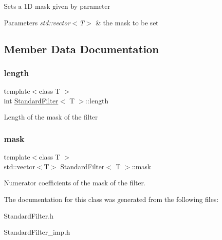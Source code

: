 Sets a 1D mask given by parameter 
\begin{DoxyParams}{Parameters}
{\em std\+::vector$<$\+T$>$} & the mask to be set \\
\hline
\end{DoxyParams}


\subsection{Member Data Documentation}
\mbox{\label{class_standard_filter_aa693971cea1c7c485a19928fd77a91c7}} 
\subsubsection{\texorpdfstring{length}{length}}
{\footnotesize\ttfamily template$<$class T $>$ \\
int \hyperlink{class_standard_filter}{Standard\+Filter}$<$ T $>$\+::length\hspace{0.3cm}{\ttfamily [protected]}}

Length of the mask of the filter \mbox{\label{class_standard_filter_afc83cf6d1aa9cf9a1ae4a8c476d8a66d}} 
\subsubsection{\texorpdfstring{mask}{mask}}
{\footnotesize\ttfamily template$<$class T $>$ \\
std\+::vector$<$T$>$ \hyperlink{class_standard_filter}{Standard\+Filter}$<$ T $>$\+::mask\hspace{0.3cm}{\ttfamily [protected]}}

Numerator coefficients of the mask of the filter. 

The documentation for this class was generated from the following files\+:\begin{DoxyCompactItemize}
\item 
Standard\+Filter.\+h\item 
Standard\+Filter\+\_\+imp.\+h\end{DoxyCompactItemize}
